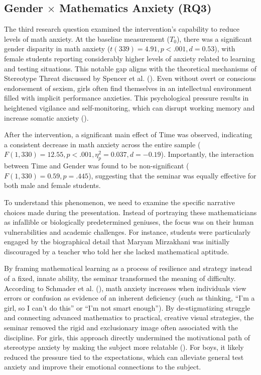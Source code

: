 \subsection{Gender $\times$ Mathematics Anxiety (RQ3)}
The third research question examined the intervention's capability to reduce levels of math anxiety. At the baseline measurement ($T_0$), there was a significant gender disparity in math anxiety ($t(339) = 4.91, p < .001, d = 0.53$), with female students reporting considerably higher levels of anxiety related to learning and testing situations. This notable gap aligns with the theoretical mechanisms of Stereotype Threat discussed by Spencer et al. (\citeyear{Spencer1999}). Even without overt or conscious endorsement of sexism, girls often find themselves in an intellectual environment filled with implicit performance anxieties. This psychological pressure results in heightened vigilance and self-monitoring, which can disrupt working memory and increase somatic anxiety (\cite{Beilock2004, Ramirez2013}).

After the intervention, a significant main effect of Time was observed, indicating a consistent decrease in math anxiety across the entire sample ($F(1, 330) = 12.55, p < .001, \eta_p^2 = 0.037, d = -0.19$). Importantly, the interaction between Time and Gender was found to be non-significant ($F(1, 330) = 0.59, p = .445$), suggesting that the seminar was equally effective for both male and female students.

To understand this phenomenon, we need to examine the specific narrative choices made during the presentation. Instead of portraying these mathematicians as infallible or biologically predetermined geniuses, the focus was on their human vulnerabilities and academic challenges. For instance, students were particularly engaged by the biographical detail that Maryam Mirzakhani was initially discouraged by a teacher who told her she lacked mathematical aptitude.

By framing mathematical learning as a process of resilience and strategy instead of a fixed, innate ability, the seminar transformed the meaning of difficulty. According to Schmader et al. (\citeyear{Schmader2008}), math anxiety increases when individuals view errors or confusion as evidence of an inherent deficiency (such as thinking, ``I'm a girl, so I can't do this'' or ``I'm not smart enough''). By de-stigmatizing struggle and connecting advanced mathematics to practical, creative visual strategies, the seminar removed the rigid and exclusionary image often associated with the discipline. For girls, this approach directly undermined the motivational path of stereotype anxiety by making the subject more relatable (\cite{Nosek2002}). For boys, it likely reduced the pressure tied to the expectations, which can alleviate general test anxiety and improve their emotional connections to the subject.

